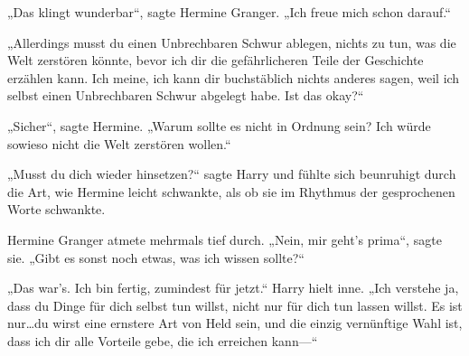 „Das klingt wunderbar“, sagte Hermine Granger. „Ich freue mich schon darauf.“

„Allerdings musst du einen Unbrechbaren Schwur ablegen, nichts zu tun, was die Welt zerstören könnte, bevor ich dir die gefährlicheren Teile der Geschichte erzählen kann. Ich meine, ich kann dir buchstäblich nichts anderes sagen, weil ich selbst einen Unbrechbaren Schwur abgelegt habe. Ist das okay?“

„Sicher“, sagte Hermine. „Warum sollte es nicht in Ordnung sein? Ich würde sowieso nicht die Welt zerstören wollen.“

„Musst du dich wieder hinsetzen?“ sagte Harry und fühlte sich beunruhigt durch die Art, wie Hermine leicht schwankte, als ob sie im Rhythmus der gesprochenen Worte schwankte.

Hermine Granger atmete mehrmals tief durch. „Nein, mir geht’s prima“, sagte sie.
„Gibt es sonst noch etwas, was ich wissen sollte?“

„Das war’s. Ich bin fertig, zumindest für jetzt.“
Harry hielt inne.
„Ich verstehe ja, dass du Dinge für dich selbst tun willst, nicht nur für dich tun lassen willst. Es ist nur…du wirst eine ernstere Art von Held sein, und die einzig vernünftige Wahl ist, dass ich dir alle Vorteile gebe, die ich erreichen kann—“

